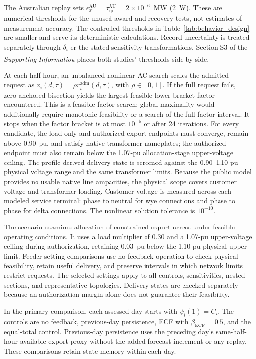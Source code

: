 \documentclass[twoside,twocolumn,9pt]{article}
\newcommand{\suppref}{\textit{Supporting Information}\textsuperscript{\dag}}
\begin{document}
{The Australian replay sets
$\epsilon_x^{\mathrm{AU}}=\tau_{\mathrm{rpl}}^{\mathrm{AU}}=2\times10^{-6}$~MW
(2~W). These are numerical thresholds for the unused-award and recovery tests,
not estimates of measurement accuracy. The controlled thresholds in
Table~\ref{tab:behavior_design} are smaller and serve its deterministic
calculations. Record uncertainty is treated separately through
$\delta_i$ or the stated sensitivity transformations. Section S3 of the
\suppref{} places both studies' thresholds side by side.

At each half-hour, an unbalanced nonlinear AC search scales the admitted request
as $x_i(d,\tau)=\rho r_i^{\mathrm{adm}}(d,\tau)$, with
$\rho\in[0,1]$. If the full request fails, zero-anchored bisection yields the
largest feasible lower-bracket factor encountered. This is a feasible-factor search; global maximality would additionally require
monotonic feasibility or a search of the full factor interval.
It stops when the factor bracket is at most $10^{-5}$ or after 24 iterations.
For every candidate, the load-only and authorized-export endpoints must
converge, remain above 0.90~pu, and satisfy native transformer nameplates; the
authorized endpoint must also remain below the 1.07-pu allocation-stage
upper-voltage ceiling. The profile-derived delivery state is screened against
the 0.90--1.10-pu physical voltage range and the same transformer limits.
Because the public model provides no usable native line ampacities, the physical
scope covers customer voltage and transformer loading.
Customer voltage is measured across each modeled service terminal: phase to
neutral for wye connections and phase to phase for delta connections. The
nonlinear solution tolerance is $10^{-10}$.

The scenario examines allocation of constrained export access under feasible
operating conditions. It uses a load multiplier of 0.30 and a 1.07-pu
upper-voltage ceiling during authorization, retaining 0.03~pu below the
1.10-pu physical upper limit. Feeder-setting comparisons use no-feedback
operation to check physical feasibility, retain useful delivery, and preserve
intervals in which network limits restrict requests. The selected settings
apply to all controls, sensitivities, nested sections, and representative
topologies. Delivery states are checked separately because an authorization
margin alone does not guarantee their feasibility.

In the primary comparison, each assessed day starts with $\psi_i(1)=C_i$.
The controls are no feedback,
previous-day persistence, ECF with $\beta_{\mathrm{ECF}}=0.5$, and the
equal-total control. Previous-day persistence uses the preceding day's
same-half-hour available-export proxy without the added forecast increment or
any replay. These comparisons retain state memory within each day.

}
\end{document}
